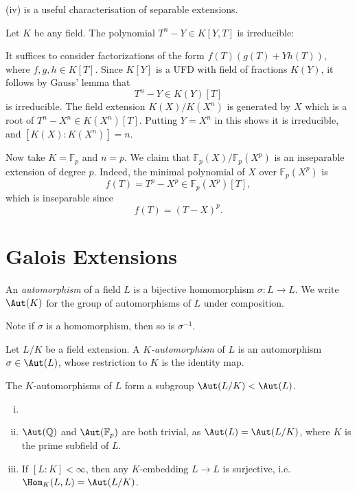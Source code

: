 \documentclass[12pt]{article}
\begin{document}
(iv) is a useful characterisation of separable extensions.

\begin{exbox}
	Let $K$ be any field. The polynomial $T^{n} - Y \in K[Y,T]$ is irreducible:

	It suffices to consider factorizations of the form $f(T)(g(T)+Yh(T))$, where $f, g, h \in K[T]$. Since $K[Y]$ is a UFD with field of fractions $K(Y)$, it follows by Gauss' lemma that
	\[
		T^{n} - Y \in K(Y)[T]
	\]
	is irreducible. The field extension $K(X)/K(X^{n})$ is generated by $X$ which is a root of $T^{n} - X^{n} \in K(X^{n})[T]$. Putting $Y = X^{n}$ in this shows it is irreducible, and $[K(X):K(X^{n})] = n$.

	Now take $K = \mathbb{F}_p$ and $n = p$. We claim that $\mathbb{F}_p(X) / \mathbb{F}_p(X^{p})$ is an inseparable extension of degree $p$. Indeed, the minimal polynomial of $X$ over $\mathbb{F}_p(X^{p})$ is
	\[
		f(T) = T^{p} - X^{p} \in \mathbb{F}_p(X^{p})[T],
	\]
	which is inseparable since
	\[
	f(T) = (T-X)^{p}.
	\]
\end{exbox}


\newpage

\section{Galois Extensions}

\begin{definition}
	An \emph{automorphism} of a field $L$ is a bijective homomorphism $\sigma : L \to L$. We write $\Aut(K)$ for the group of automorphisms of $L$ under composition.
\end{definition}

Note if $\sigma$ is a homomorphism, then so is $\sigma^{-1}$.

\begin{definition}
	Let $L/K$ be a field extension. A $K$\emph{-automorphism} of $L$ is an automorphism $\sigma \in \Aut(L)$, whose restriction to $K$ is the identity map.

	The $K$-automorphisms of $L$ form a subgroup $\Aut(L/K) < \Aut(L)$.
\end{definition}

\begin{remark}
	\begin{enumerate}[(i)]
		\item[]
		\item $\Aut(\mathbb{Q})$ and $\Aut(\mathbb{F}_p)$ are both trivial, as $\Aut(L) = \Aut(L/K)$, where $K$ is the prime subfield of $L$.
		\item If $[L:K]< \infty$, then any $K$-embedding $L \to L$ is surjective, i.e. $\Hom_K(L,L) = \Aut(L/K)$.
	\end{enumerate}
\end{remark}
\end{document}
